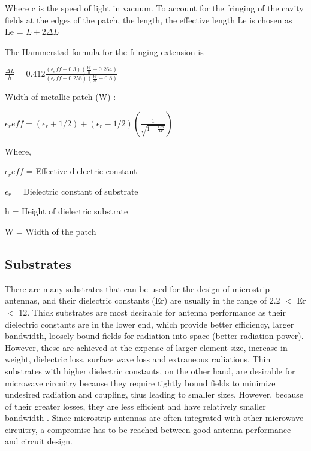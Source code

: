 				\justify
	             Where c is the speed of light in vacuum. To account for the fringing of the cavity fields at the edges of the patch, the length, the effective length Le is chosen as \\
			               \centering
                              Le =  $ L +  2 \Delta L $

	             \justify
	             The Hammerstad formula for the fringing extension is
		             
	             \centering
		             $ \frac{\Delta L}{h} = 0.412 \frac{(\epsilon_eff + 0.3)(\frac{W}{h} + 0.264)}{(\epsilon_eff + 0.258)(\frac{W}{h} + 0.8)} $
	             
				\justify
	             Width of metallic patch (W) :
	             
		             \centering
		               $ \epsilon_reff = (\epsilon_r + 1 / 2 ) + (\epsilon_r - 1 / 2 )(\frac{1}{\sqrt{1 + \frac{12 h}{W}}}) $
		               

				\justify
                  Where,
                  \item
                    $ \epsilon_reff $ = Effective dielectric constant
                    \item
                    $ \epsilon_r $ = Dielectric constant of substrate
                  \item
                    h = Height of dielectric substrate
                     \item
                    W = Width of the patch

	         \cleardoublepage
				\subsection{Substrates }\label{sub:Substrates Characteristics}
		           \justify
		            There are many substrates that can be used for the design of microstrip antennas, and their dielectric constants (Er) are usually in the range of 2.2 $<$ Er $<$ 12. Thick substrates are most desirable for antenna performance as their dielectric constants are in the lower end, which provide better efficiency, larger bandwidth, loosely bound fields for radiation into space (better radiation power). However, these are achieved at the expense of larger element size, increase in weight, dielectric loss, surface wave loss and extraneous radiations. Thin substrates with higher dielectric constants, on the other hand, are desirable for microwave circuitry because they require tightly bound fields to minimize undesired radiation and coupling, thus leading to smaller sizes. However, because of their greater losses, they are less efficient and have relatively smaller bandwidth . Since microstrip antennas are often integrated with other microwave circuitry, a compromise has to be reached between good antenna performance and circuit design.

